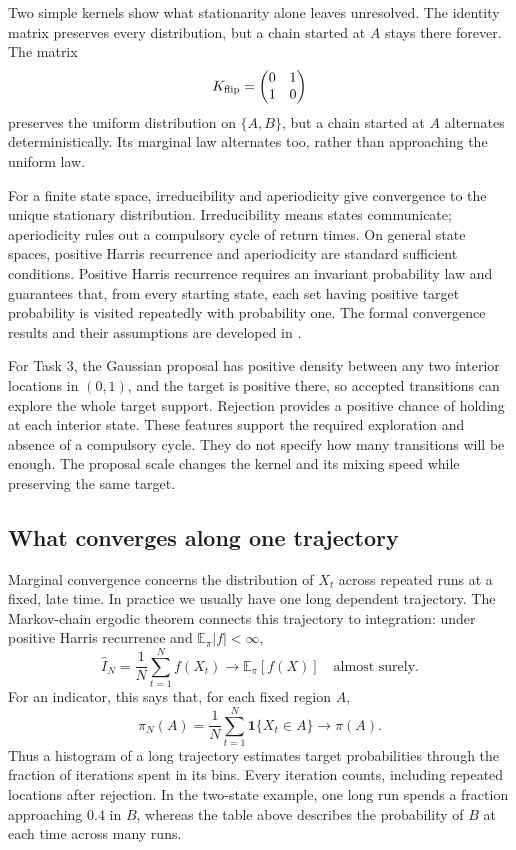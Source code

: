 \documentclass[11pt,a4paper]{article}
\newcommand{\E}{\mathbb E}
\newcommand{\ind}{\mathbf 1}
\begin{document}
Two simple kernels show what stationarity alone leaves unresolved.
The identity matrix preserves every distribution, but a chain started at
$A$ stays there forever. The matrix
\[
 K_{\rm flip}=\begin{pmatrix}0&1\\1&0\end{pmatrix}
\]
preserves the uniform distribution on $\{A,B\}$, but a chain started at $A$
alternates deterministically. Its marginal law alternates too, rather than
approaching the uniform law.

For a finite state space, irreducibility and aperiodicity give convergence
to the unique stationary distribution. Irreducibility means states
communicate; aperiodicity rules out a compulsory cycle of return times.
On general state spaces, positive Harris recurrence and aperiodicity are
standard sufficient conditions. Positive Harris recurrence requires an
invariant probability law and guarantees that, from every starting state,
each set having positive target probability is visited repeatedly with
probability one. The formal convergence results and their assumptions are
developed in \cite{robertsrosenthal}.

For Task 3, the Gaussian proposal has positive density between any two
interior locations in $(0,1)$, and the target is positive there, so accepted
transitions can explore the whole target support. Rejection provides a
positive chance of holding at each interior state. These features support
the required exploration and absence of a compulsory cycle.
They do not specify how many transitions will be enough. The proposal scale
changes the kernel and its mixing speed while preserving the same target.

\subsection{What converges along one trajectory}
Marginal convergence concerns the distribution of $X_t$ across repeated
runs at a fixed, late time. In practice we usually have one long dependent
trajectory. The Markov-chain ergodic theorem connects this trajectory to
integration: under positive Harris recurrence and $\E_\pi|f|<\infty$,
\[
 \widehat I_N=\frac1N\sum_{t=1}^N f(X_t)
 \longrightarrow \E_\pi[f(X)]
 \quad\text{almost surely}.
\]
For an indicator, this says that, for each fixed region $A$,
\[
 \widehat\pi_N(A)=\frac1N\sum_{t=1}^N\ind\{X_t\in A\}
 \longrightarrow\pi(A).
\]
Thus a histogram of a long trajectory estimates target probabilities through
the fraction of iterations spent in its bins. Every iteration counts,
including repeated locations after rejection. In the two-state example,
one long run spends a fraction approaching $0.4$ in $B$, whereas the table
above describes the probability of $B$ at each time across many runs.
\end{document}

